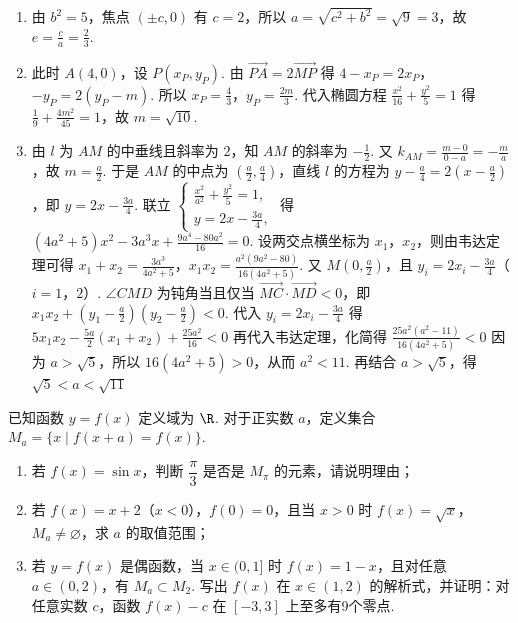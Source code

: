 \documentclass[UTF8,a4paper,oneside,11pt]{ctexbook}
\begin{document}
\begin{solution}
\begin{enumerate}
\item 由 \(b^2=5\)，焦点 \((\pm c,0)\) 有 \(c=2\)，所以 \(a=\sqrt{c^2+b^2}=\sqrt9=3\)，故 \(e=\frac{c}{a}=\frac23\).

\item 此时 \(A(4,0)\)，设 \(P(x_P,y_P)\). 由 \(\overrightarrow{PA}=2\overrightarrow{MP}\) 得
\(4-x_P=2x_P\)，\(-y_P=2(y_P-m)\).
所以 \(x_P=\frac43\)，\(y_P=\frac{2m}{3}\). 代入椭圆方程 \(\frac{x^2}{16}+\frac{y^2}{5}=1\) 得 \(\frac{1}{9}+\frac{4m^2}{45}=1\)，故 \(m=\sqrt{10}\).

\item 由 \(l\) 为 \(AM\) 的中垂线且斜率为 \(2\)，知 \(AM\) 的斜率为 \(-\frac12\). 又 \(k_{AM}=\frac{m-0}{0-a}=-\frac{m}{a}\)，故 \(m=\frac a2\). 于是 \(AM\) 的中点为 \(\left(\frac a2,\frac a4\right)\)，直线 \(l\) 的方程为 \(y-\frac a4=2\left(x-\frac a2\right)\)，即 \(y=2x-\frac{3a}{4}\).
联立
\(
\begin{cases}
\frac{x^2}{a^2}+\frac{y^2}{5}=1,\\
y=2x-\frac{3a}{4},
\end{cases}
\)
得
\((4a^2+5)x^2-3a^3x+\frac{9a^4-80a^2}{16}=0\).
设两交点横坐标为 \(x_1\)，\(x_2\)，则由韦达定理可得
\(x_1+x_2=\frac{3a^3}{4a^2+5}\)，\(x_1x_2=\frac{a^2(9a^2-80)}{16(4a^2+5)}\).
又 \(M\left(0,\frac a2\right)\)，且 \(y_i=2x_i-\frac{3a}{4}\)（\(i=1\)，\(2\)）. \(\angle CMD\) 为钝角当且仅当 \(\overrightarrow{MC}\cdot\overrightarrow{MD}<0\)，即 \(x_1x_2+\left(y_1-\frac a2\right)\left(y_2-\frac a2\right)<0\).
代入 \(y_i=2x_i-\frac{3a}{4}\) 得
\(
5x_1x_2-\frac{5a}{2}(x_1+x_2)+\frac{25a^2}{16}<0
\)
再代入韦达定理，化简得
\(
\frac{25a^2(a^2-11)}{16(4a^2+5)}<0
\)
因为 \(a>\sqrt5\)，所以 \(16(4a^2+5)>0\)，从而 \(a^2<11\). 再结合 \(a>\sqrt5\)，得
\(
\sqrt5<a<\sqrt{11}
\)
\end{enumerate}
\end{solution}

\begin{problem}
已知函数 \(y=f(x)\) 定义域为 \(\R\). 对于正实数 \(a\)，定义集合 \(M_a=\{x\mid f(x+a)=f(x)\}\).
\begin{enumerate}
\item 若 \(f(x)=\sin x\)，判断 \(\dfrac{\pi}{3}\) 是否是 \(M_{\pi}\) 的元素，请说明理由；
\item 若 \(f(x)=x+2\)（\(x<0\)），\(f(0)=0\)，且当 \(x>0\) 时 \(f(x)=\sqrt{x}\)，\(M_a\neq\varnothing\)，求 \(a\) 的取值范围；
\item 若 \(y=f(x)\) 是偶函数，当 \(x\in(0,1]\) 时 \(f(x)=1-x\)，且对任意 \(a\in(0,2)\)，有 \(M_a\subset M_2\). 写出 \(f(x)\) 在 \(x\in(1,2)\) 的解析式，并证明：对任意实数 \(c\)，函数 \(f(x)-c\) 在 \([-3,3]\) 上至多有9个零点.
\end{enumerate}
\end{problem}
\end{document}
